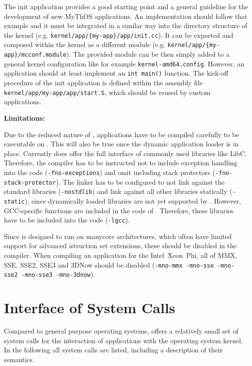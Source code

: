 The init application provides a good starting point and a general guideline for
the development of new MyThOS applications. An implementation should follow that
example and it must be integrated in a similar way into the directory structure
of the kernel (e.g. \texttt{kernel/app/\{my-app\}/app/init.cc}). It can be
exported and composed within the kernel as a different module (e.g.
\texttt{kernel/app/\{my-app\}/mcconf.module}). The provided module can be then
simply added to a general kernel configuration like for example
\texttt{kernel-amd64.config}. However, an application should at least implement
an \texttt{int main()} function. The kick-off procedure of the init application
is defined within the assembly file \texttt{kernel/app/{my-app}/app/start.S},
which should be reused by custom applications.

\noindent\textbf{Limitations:}

Due to  the reduced nature of \mythos, applications have to be compiled
carefully to be executable on \mythos. This will also be true once the dynamic
application loader is in place. Currently \mythos does offer the full interface
of commonly used libraries like LibC. Therefore, the compiler has to be
instructed not to include exception handling into the code
(\texttt{-fno-exceptions}) and omit including stack protectors
(\texttt{-fno-stack-protector}). The linker has to be configured to not link
against the standard libraries (\texttt{-nostdlib}) and link against all other
libraries statically (\texttt{-static}), since dynamically loaded libraries are
not yet supported by \mythos. However, GCC-specific functions are included in
the code of \mythos. Therefore, these libraries have to be included into the
code (\texttt{-lgcc}).

Since \mythos is designed to run on manycore architectures, which often have
limited support for advanced istruction set extensions, these should be disabled
in the compiler. When compiling an application for the
Intel\textcopyright~Xeon~Phi\texttrademark{}, all of MMX, SSE, SSE2, SSE3 and
3DNow should be disabled (\texttt{-mno-mmx -mno-sse -mno-sse2 -mno-sse3
-mno-3dnow}).

\section{Interface of \mythos System Calls}

Compared to general purpose operating systems, \mythos offers a relatively
small set of system calls for the interaction of applications with the
operating system kernel. In the following all system calls are listed,
including a description of their semantics.

